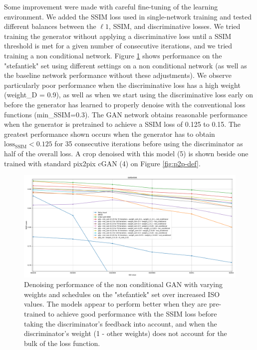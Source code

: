 Some improvement were made with careful fine-tuning of the learning environment. We added the \ac{SSIM} loss used in single-network training and tested different balances between the $\ell 1$, \ac{SSIM}, and discriminative losses. We tried training the generator without applying a discriminative loss until a SSIM threshold is met for a given number of consecutive iterations, and we tried training a non conditional network. Figure \ref{fig:p2p-comp-1} shows performance on the "stefantiek" set using different settings on a non conditional network (as well as the baseline network performance without these adjustments). We observe particularly poor performance when the discriminative loss has a high weight (weight\_D = 0.9), as well as when we start using the discriminative loss early on before the generator has learned to properly denoise with the conventional loss functions (min\_SSIM=0.3). The GAN network obtains reasonable performance when the generator is pretrained to achieve a \ac{SSIM} loss of 0.125 to 0.15. The greatest performance shown occurs when the generator has to obtain $\text{loss}_\text{SSIM} < 0.125$ for 35 consecutive iterations before using the discriminator as half of the overall loss. A crop denoised with this model (5) is shown beside one trained with standard pix2pix \ac{cGAN} (4) on Figure \ref{fig:p2p-def}.

\begin{figure}[!htbp]
\centering
\includegraphics[width=1\linewidth]{gfx/graphs/p2p-comp-1.pdf}
\caption[Denoising performance of \acsp{GAN} on the "stefantiek" set]{Denoising performance of the non conditional GAN with varying weights and schedules on the "stefantiek" set over increased ISO values. The models appear to perform better when they are pre-trained to achieve good performance with the \acs{SSIM} loss before taking the discriminator's feedback into account, and when the discriminator's weight (1 - other weights) does not account for the bulk of the loss function.}
\label{fig:p2p-comp-1}
\end{figure}

